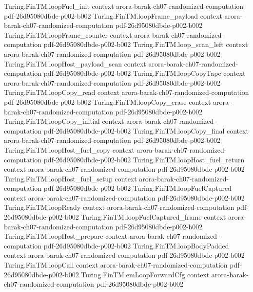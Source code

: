 \begin{theorem}
\proofstep
  {Turing.FinTM.loopFuel_init}
  {context}
  {arora-barak-ch07-randomized-computation}
  {pdf-26d95080dbde-p002-b002}
\proofstep
  {Turing.FinTM.loopFrame_payload}
  {context}
  {arora-barak-ch07-randomized-computation}
  {pdf-26d95080dbde-p002-b002}
\proofstep
  {Turing.FinTM.loopFrame_counter}
  {context}
  {arora-barak-ch07-randomized-computation}
  {pdf-26d95080dbde-p002-b002}
\proofstep
  {Turing.FinTM.loop_scan_left}
  {context}
  {arora-barak-ch07-randomized-computation}
  {pdf-26d95080dbde-p002-b002}
\proofstep
  {Turing.FinTM.loopHost_payload_scan}
  {context}
  {arora-barak-ch07-randomized-computation}
  {pdf-26d95080dbde-p002-b002}
\proofstep
  {Turing.FinTM.loopCopyTape}
  {context}
  {arora-barak-ch07-randomized-computation}
  {pdf-26d95080dbde-p002-b002}
\proofstep
  {Turing.FinTM.loopCopy_read}
  {context}
  {arora-barak-ch07-randomized-computation}
  {pdf-26d95080dbde-p002-b002}
\proofstep
  {Turing.FinTM.loopCopy_erase}
  {context}
  {arora-barak-ch07-randomized-computation}
  {pdf-26d95080dbde-p002-b002}
\proofstep
  {Turing.FinTM.loopCopy_initial}
  {context}
  {arora-barak-ch07-randomized-computation}
  {pdf-26d95080dbde-p002-b002}
\proofstep
  {Turing.FinTM.loopCopy_final}
  {context}
  {arora-barak-ch07-randomized-computation}
  {pdf-26d95080dbde-p002-b002}
\proofstep
  {Turing.FinTM.loopHost_fuel_copy}
  {context}
  {arora-barak-ch07-randomized-computation}
  {pdf-26d95080dbde-p002-b002}
\proofstep
  {Turing.FinTM.loopHost_fuel_return}
  {context}
  {arora-barak-ch07-randomized-computation}
  {pdf-26d95080dbde-p002-b002}
\proofstep
  {Turing.FinTM.loopHost_fuel_setup}
  {context}
  {arora-barak-ch07-randomized-computation}
  {pdf-26d95080dbde-p002-b002}
\proofstep
  {Turing.FinTM.loopFuelCaptured}
  {context}
  {arora-barak-ch07-randomized-computation}
  {pdf-26d95080dbde-p002-b002}
\proofstep
  {Turing.FinTM.loopReady}
  {context}
  {arora-barak-ch07-randomized-computation}
  {pdf-26d95080dbde-p002-b002}
\proofstep
  {Turing.FinTM.loopFuelCaptured_frame}
  {context}
  {arora-barak-ch07-randomized-computation}
  {pdf-26d95080dbde-p002-b002}
\proofstep
  {Turing.FinTM.loopHost_prepare}
  {context}
  {arora-barak-ch07-randomized-computation}
  {pdf-26d95080dbde-p002-b002}
\proofstep
  {Turing.FinTM.loopBodyPadded}
  {context}
  {arora-barak-ch07-randomized-computation}
  {pdf-26d95080dbde-p002-b002}
\proofstep
  {Turing.FinTM.loopCall}
  {context}
  {arora-barak-ch07-randomized-computation}
  {pdf-26d95080dbde-p002-b002}
\proofstep
  {Turing.FinTM.emLoopForwardCfg}
  {context}
  {arora-barak-ch07-randomized-computation}
  {pdf-26d95080dbde-p002-b002}

\end{theorem}
